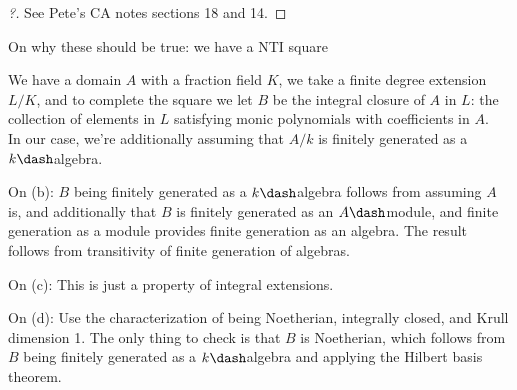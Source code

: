 \begin{proof}[?]

See Pete's CA notes sections 18 and 14.

\end{proof}

\begin{remark}

On why these should be true: we have a NTI square

\begin{center}\end{center}

We have a domain \(A\) with a fraction field \(K\), we take a finite
degree extension \(L/K\), and to complete the square we let \(B\) be the
integral closure of \(A\) in \(L\): the collection of elements in \(L\)
satisfying monic polynomials with coefficients in \(A\).\\

In our case, we're additionally assuming that \(A/k\) is finitely
generated as a \(k\dash\)algebra.

\end{remark}

\begin{remark}

\envlist

On (b): \(B\) being finitely generated as a \(k\dash\)algebra follows
from assuming \(A\) is, and additionally that \(B\) is finitely
generated as an \(A\dash\)module, and finite generation as a module
provides finite generation as an algebra. The result follows from
transitivity of finite generation of algebras.

On (c): This is just a property of integral extensions.

On (d): Use the characterization of being Noetherian, integrally closed,
and Krull dimension 1. The only thing to check is that \(B\) is
Noetherian, which follows from \(B\) being finitely generated as a
\(k\dash\)algebra and applying the Hilbert basis theorem.

\end{remark}

